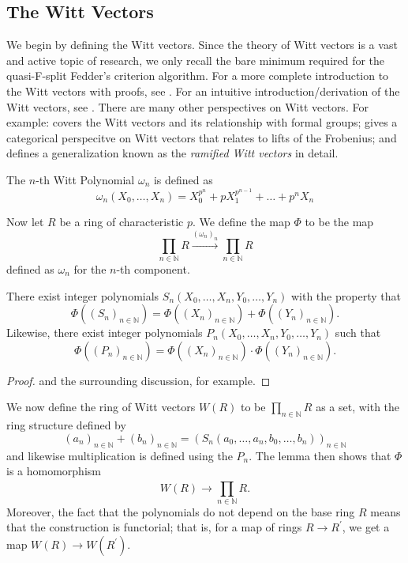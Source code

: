 
\subsection{The Witt Vectors}

We begin by defining the Witt vectors. 
Since the theory of Witt vectors is a vast and active topic of research,
we only recall the bare minimum 
required for the quasi-F-split Fedder's criterion algorithm.
For a more complete introduction to the Witt vectors with proofs, 
see \cite{rabinoff-2014-witt-vec}.
For an intuitive introduction/derivation of the Witt vectors, see
\cite{kim-2017-witt-vec}.
There are many other perspectives on Witt vectors. 
For example:
\cite[Chapter~17]{hazewinkel-1978-formal-groups} covers the Witt vectors
and its relationship with formal groups; 
\cite{kedlaya-2021-prismatic} gives a categorical perspecitve on Witt vectors
that relates to lifts of the Frobenius; and
\cite[Chapter~1]{schneider-2017-galois-rep-phi-gamma} defines a generalization
known as the \textit{ramified Witt vectors} in detail.

\begin{defn}
	The \(n\)-th Witt Polynomial \(\omega_{n}\) is defined as
	\[
		\omega_{n}(X_{0}, \ldots, X_{n}) = X_{0}^{p^{n}} + pX_{1}^{p^{n-1}} + \ldots + p^{n}X_{n}
	\] 
\end{defn}

Now let \(R\) be a ring of characteristic \(p\).
We define the map \(\Phi\) to be the map 
\[
	\prod_{n \in \mathbb{N}}^{} R 
	\xrightarrow{(\omega_{n})_{n}} 
	\prod_{n \in \mathbb{N}}^{} R  
\] 
defined as \(\omega_{n}\) for the \(n\)-th component.

\begin{lem}
	There exist integer polynomials 
	\(S_n(X_{0}, \ldots, X_{n}, Y_{0}, \ldots, Y_{n})\) 
	with the property that 
	\[
		\Phi((S_{n})_{n \in \mathbb{N}}) =
		\Phi((X_{n})_{n \in \mathbb{N}}) 
		+ \Phi((Y_{n})_{n \in \mathbb{N}})
	.\] 
	Likewise, there exist integer polynomials 
	\(P_{n}(X_{0}, \ldots, X_{n}, Y_{0}, \ldots, Y_{n})\)
	such that
	\[
		\Phi((P_{n})_{n \in \mathbb{N}}) =
		\Phi((X_{n})_{n \in \mathbb{N}}) 
		\cdot \Phi((Y_{n})_{n \in \mathbb{N}})
	.\] 
\end{lem}

\begin{proof}
	\cite[Theorem~2.6]{rabinoff-2014-witt-vec} and the 
	surrounding discussion, for example.
\end{proof}

We now define the ring of Witt vectors 
\(W(R)\) to be 
\(\prod_{n \in \mathbb{N}}^{} R \) 
as a set, with the ring structure defined
by 
\[
	(a_{n})_{n \in \mathbb{N}} + 
	(b_{n})_{n \in \mathbb{N}} =
	(S_{n}(a_{0}, \ldots, a_{n}, b_{0}, \ldots, b_{n}))_{n \in \mathbb{N}}
\] 
and likewise multiplication is defined
using the \(P_{n}\).
The lemma then shows that \(\Phi\) is a homomorphism 
\[
	W(R) \xrightarrow{} \prod_{n \in \mathbb{N}}^{} R 
.\] 
Moreover, the fact that the polynomials do not depend on the base
ring \(R\) means that the construction is functorial; that is,
for a map of rings \(R \xrightarrow{} R^{\prime} \), we get a 
map \(W(R) \xrightarrow{} W(R^{\prime})\).

